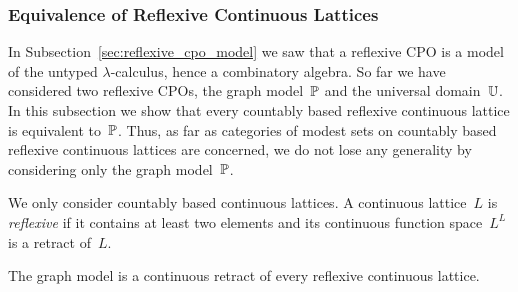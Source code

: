 

\subsubsection{Equivalence of Reflexive Continuous Lattices}
\label{sec:equivalence_reflexive_continuous_lattices}%

%
%

In Subsection~\ref{sec:reflexive_cpo_model} we saw that a reflexive
CPO is a model of the untyped $\lambda$-calculus, hence a combinatory
algebra. So far we have considered two reflexive CPOs, the graph
model~$\mathbb{P}$ and the universal domain~$\mathbb{U}$. In this subsection we show
that every countably based reflexive continuous lattice is equivalent
to~$\mathbb{P}$. Thus, as far as categories of modest sets on countably based
reflexive continuous lattices are concerned, we do not lose any
generality by considering only the graph model~$\mathbb{P}$.

We only consider countably based continuous lattices.
%
%
%
%
A continuous lattice~$L$ is \emph{reflexive} if it contains at least
two elements and its continuous function space~$L^L$ is a retract
of~$L$.

\begin{proposition}
  \label{th:PP_retract_of_reflexive_lattice}%
  The graph model is a continuous retract of every reflexive
  continuous lattice.
\end{proposition}

